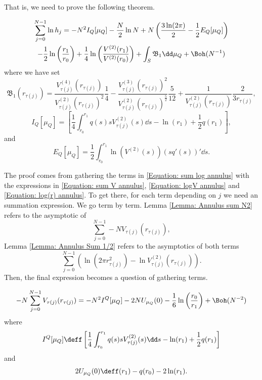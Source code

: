 That is, we need to prove the following theorem.

\begin{teorema}
	\begin{multline}
		\sum_{j=0}^{N-1} \ln{h_j} = - N^2 I_Q[\mu_Q] - \frac{N}{2} \ln N + N \left(\frac{3\ln(2\pi)}{2} - \frac{1}{2} E_Q[\mu_Q]\right) \\ - \frac{1}{2} \ln\left(\frac{r_1}{r_0} \right) + \frac{1}{4} \ln\left(\frac{V^{(2)}(r_1)}{V^{(2)}(r_0)} \right) + \int_S \mathfrak{B}_1 \dd \mu_Q + \Boh(N^{-1})
	\end{multline}
	where we have set
	\begin{equation}
		\mathfrak{B}_1(r_{\tau(j)})  = \frac{V^{(4)}_{\tau(j)}(r_{\tau(j)})}{V^{(2)}_{\tau(j)}(r_{\tau(j)})^2} \frac{1}{4} - \frac{V^{(3)}_{\tau(j)}(r_{\tau(j)})^2}{V^{(2)}_{\tau(j)}(r_{\tau(j)})^{\frac{5}{2}}} \frac{5}{12} + \frac{1}{V^{(2)}_{\tau(j)}(r_{\tau(j)})} \frac{2}{3 r_{\tau(j)}},
	\end{equation}
	\begin{equation}
		I_Q[\mu_Q] = \left[\frac{1}{4} \int_{r_0}^{r_1} q(s) s V^{(2)}_{\tau(j)}(s) \dd s- \ln(r_1) + \frac{1}{2} q(r_1) \right],
	\end{equation}
	and
	\begin{equation}
		E_Q[\mu_Q] = \frac{1}{2} \int_{r_0}^{r_1} \ln(V^{(2)}(s)) (sq'(s))' \dd s.
	\end{equation}
	\label{Theorem: Annulus sum}
\end{teorema}

The proof comes from gathering the terms in \autoref{Equation: sum log annulus} with the expressions in \autoref{Equation: sum V annulus}, \autoref{Equation: logV annulus} and \autoref{Equation: log(r) annulus}. To get there, for each term depending on $j$ we need an summation expression. We go term by term. Lemma \ref{Lemma: Annulus sum N2} refers to the asymptotic of $$\sum_{j=0}^{N-1} -N V_{\tau(j)}(r_{\tau(j)}),$$ Lemma \ref{Lemma: Annulus Sum 1/2} refers to the asymptotics of both terms $$\sum_{j=0}^{N-1}\left(\ln(2\pi r^2_{\tau(j)}) - \ln V^{(2)}_{\tau(j)}(r_{\tau(j)}) \right).$$ Then, the final expression becomes a question of gathering terms.

\begin{lema}
	\begin{equation}
		- N \sum_{j=0}^{N-1} V_{\tau(j)}(r_{\tau(j)}) = - N^2 I^Q[\mu_Q] - 2 N U_{\mu_Q}(0) - \frac{1}{6} \ln{\left( \frac{r_0}{r_1}\right)} + \Boh(N^{-2})
		\label{Equation: sum V annulus}
	\end{equation}
	where
	\begin{equation}
		 I^Q[\mu_Q] \deff \left[\frac{1}{4} \int_{r_0}^{r_1} q(s) s V^{(2)}_{\tau(j)}(s) \dd s- \ln(r_1) + \frac{1}{2} q(r_1) \right]
	\end{equation}
	and
	\begin{equation}
		2 U_{\mu_Q}(0) \deff (r_1) - q(r_0) - 2 \ln(r_1).
	\end{equation}
	\label{Lemma: Annulus sum N2}
\end{lema}
	
